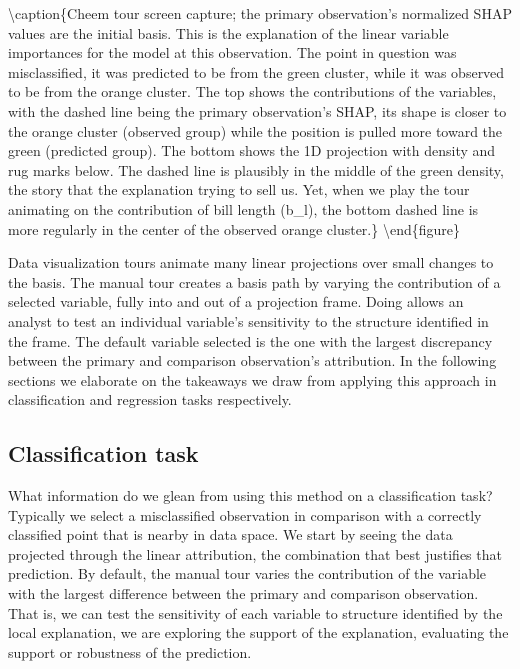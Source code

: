 \documentclass[
]{article}
\begin{document}
\textbackslash caption\{Cheem tour screen capture; the primary observation's normalized SHAP values are the initial basis. This is the explanation of the linear variable importances for the model at this observation. The point in question was misclassified, it was predicted to be from the green cluster, while it was observed to be from the orange cluster. The top shows the contributions of the variables, with the dashed line being the primary observation's SHAP, its shape is closer to the orange cluster (observed group) while the position is pulled more toward the green (predicted group). The bottom shows the 1D projection with density and rug marks below. The dashed line is plausibly in the middle of the green density, the story that the explanation trying to sell us. Yet, when we play the tour animating on the contribution of bill length (b\_l), the bottom dashed line is more regularly in the center of the observed orange cluster.\}\label{fig:cheemtour}
\textbackslash end\{figure\}

Data visualization tours animate many linear projections over small changes to the basis. The manual tour creates a basis path by varying the contribution of a selected variable, fully into and out of a projection frame. Doing allows an analyst to test an individual variable's sensitivity to the structure identified in the frame. The default variable selected is the one with the largest discrepancy between the primary and comparison observation's attribution. In the following sections we elaborate on the takeaways we draw from applying this approach in classification and regression tasks respectively.

\hypertarget{classification-task}{%
\subsection{Classification task}\label{classification-task}}

What information do we glean from using this method on a classification task? Typically we select a misclassified observation in comparison with a correctly classified point that is nearby in data space. We start by seeing the data projected through the linear attribution, the combination that best justifies that prediction. By default, the manual tour varies the contribution of the variable with the largest difference between the primary and comparison observation. That is, we can test the sensitivity of each variable to structure identified by the local explanation, we are exploring the support of the explanation, evaluating the support or robustness of the prediction.
\end{document}
